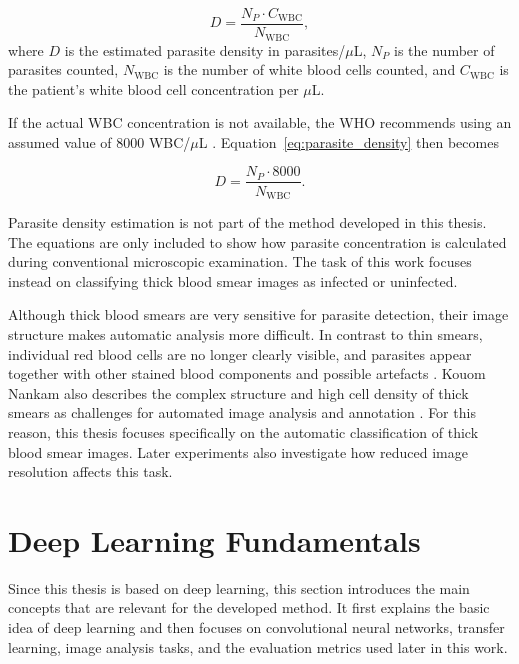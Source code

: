 \begin{equation}
D =
\frac{N_P \cdot C_{\mathrm{WBC}}}
     {N_{\mathrm{WBC}}},
\label{eq:parasite_density}
\end{equation}
where $D$ is the estimated parasite density in parasites/$\mu$L, $N_P$ is the number of parasites counted, $N_{\mathrm{WBC}}$ is the number of white blood cells counted, and $C_{\mathrm{WBC}}$ is the patient's white blood cell concentration per $\mu$L.

If the actual WBC concentration is not available, the WHO recommends using an assumed value of 8000 WBC/$\mu$L \cite{WHO2016ParasiteCounting}. Equation~\ref{eq:parasite_density} then becomes

\begin{equation}
D =
\frac{N_P \cdot 8000}
     {N_{\mathrm{WBC}}}.
\label{eq:parasite_density_who}
\end{equation}

Parasite density estimation is not part of the method developed in this thesis. The equations are only included to show how parasite concentration is calculated during conventional microscopic examination. The task of this work focuses instead on classifying thick blood smear images as infected or uninfected.

Although thick blood smears are very sensitive for parasite detection, their image structure makes automatic analysis more difficult. In contrast to thin smears, individual red blood cells are no longer clearly visible, and parasites appear together with other stained blood components and possible artefacts \cite{Yang2020}. Kouom Nankam also describes the complex structure and high cell density of thick smears as challenges for automated image analysis and annotation \cite{Kouom2026}. For this reason, this thesis focuses specifically on the automatic classification of thick blood smear images. Later experiments also investigate how reduced image resolution affects this task.

\section{Deep Learning Fundamentals}
\label{sec:deep_learning_fundamentals}

Since this thesis is based on deep learning, this section introduces the main concepts that are relevant for the developed method. It first explains the basic idea of deep learning and then focuses on convolutional neural networks, transfer learning, image analysis tasks, and the evaluation metrics used later in this work.

